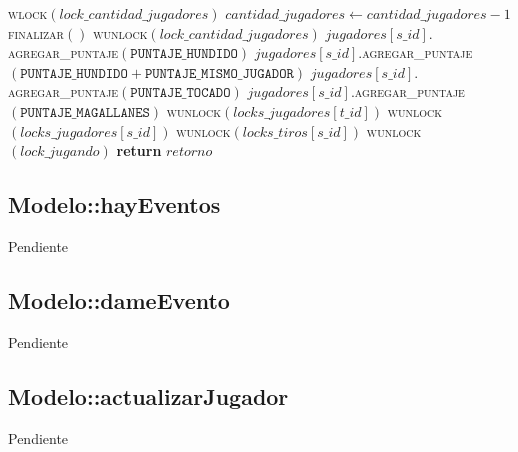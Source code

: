 \documentclass[a4paper,10pt,twoside]{article}
\newenvironment{pseudo}[1][]{%
    \vspace{0.5em}%
    \begin{algorithmic}%
}
{%
    \end{algorithmic}%
    \vspace{0.5em}%
}
\newcommand{\Fn}[2]{\textsc{#1}$(#2)$}
\newcommand{\PReturn}[1]{\textbf{return} $#1$}
\begin{document}
\begin{pseudo}
                    \State \Fn{wlock}{lock\_cantidad\_jugadores}
                    \State $cantidad\_jugadores \leftarrow cantidad\_jugadores - 1$
                        \State \Fn{finalizar}{}
                    \EndIf
                    \State \Fn{wunlock}{lock\_cantidad\_jugadores}
                \EndIf
            \EndIf
                \State $jugadores[s\_id].$\Fn{agregar\_puntaje}{\texttt{PUNTAJE\_HUNDIDO}}
                \State $jugadores[s\_id].$\Fn{agregar\_puntaje}{\texttt{PUNTAJE\_HUNDIDO} + \texttt{PUNTAJE\_MISMO\_JUGADOR}}
                \State $jugadores[s\_id].$\Fn{agregar\_puntaje}{\texttt{PUNTAJE\_TOCADO}}
                \State $jugadores[s\_id].$\Fn{agregar\_puntaje}{\texttt{PUNTAJE\_MAGALLANES}}
            \EndIf
            \State
            \State \Fn{wunlock}{locks\_jugadores[t\_id]}
            \State \Fn{wunlock}{locks\_jugadores[s\_id]}
        \EndIf
        \State
        \State \Fn{wunlock}{locks\_tiros[s\_id]}
        \State \Fn{wunlock}{lock\_jugando}
        \State
        \State \PReturn{retorno}
    \EndProcedure
\end{pseudo}


\subsection{Modelo::hayEventos}

Pendiente


\subsection{Modelo::dameEvento}

Pendiente


\subsection{Modelo::actualizarJugador}

Pendiente


\end{document}
